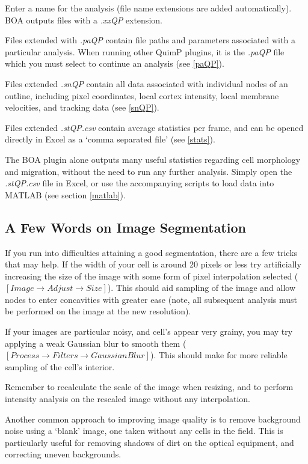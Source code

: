 \documentclass[a4paper,12pt]{article}
\begin{document}
Enter a name for the analysis (file name extensions are added automatically). BOA outputs files with a \textit{.xxQP} extension.

Files extended  with \textit{.paQP} contain file paths and parameters associated with a particular analysis.  
When running other QuimP plugins, it is the \textit{.paQP} file which you must select to continue an analysis (see \ref{paQP}).

Files extended \textit{.snQP} contain all data associated with individual nodes of an outline, including pixel coordinates, local cortex 
intensity, local membrane velocities, and tracking data (see \ref{snQP}).

Files extended \textit{.stQP.csv} contain average statistics per frame, and can be opened directly in 
Excel as a `comma separated file'  (see \ref{stats}).

The BOA plugin alone outputs many useful statistics regarding cell morphology and migration, without the need to run any further analysis.
Simply open the \textit{.stQP.csv} file in Excel, or use the accompanying scripts to load data into MATLAB (see section \ref{matlab}).


\subsection{A Few Words on Image Segmentation}

If you run into difficulties attaining a good segmentation, there are a few tricks that may help.  If the width of your cell is around 20 pixels or less
try artificially increasing the size of the image with some form of pixel interpolation selected ($[Image \rightarrow Adjust \rightarrow Size]$).
This should aid sampling of the image and allow nodes to enter concavities with greater ease (note, all subsequent analysis
must be performed on the image at the new resolution).

If your images are particular noisy, and cell's appear very grainy, you may try applying a weak Gaussian blur to smooth them
($[Process\rightarrow Filters\rightarrow Gaussian Blur]$).  This should make for more reliable sampling of the cell's interior.

Remember to recalculate the scale of the image when resizing, and to perform intensity analysis on the rescaled image without any interpolation.

Another common approach to improving image quality is to remove background noise using a `blank' image, one taken without any
cells in the field.  This is particularly useful for removing shadows of dirt on the optical equipment, and correcting uneven backgrounds.
\end{document}
